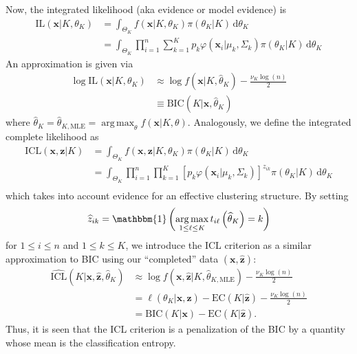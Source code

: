 \documentclass{uwstat572}
\newcommand*\ba{\[ \begin{aligned}}
\newcommand*\ea{\end{aligned} \]}
\newcommand*\ind[1]{\mathbbm{1}\left(#1\right)}
\newcommand*\estim[1]{\widehat{#1}}
\newcommand*\der{\text{d}}
\newcommand*\bx{\mathbf{x}}
\newcommand*\bz{\mathbf{z}}
\DeclareMathOperator*{\argmax}{arg\;max}
\renewcommand\;{\,}
\renewcommand\phi{\varphi}
\begin{document}
Now, the integrated likelihood (aka evidence or model evidence) is
\ba
\text{IL}(\bx | K, \theta_K)
	& = \int_{\Theta_{K}} f(\bx | K, \theta_K) \pi(\theta_K | K) \; \der \theta_K \\
	& = \int_{\Theta_{K}} \prod_{i=1}^n \sum_{k=1}^K p_k \phi(\bx_i | \mu_k, \Sigma_k) \pi(\theta_K | K) \; \der \theta_K
\ea
An approximation is given via
\ba
	\log \text{IL}(\bx | K, \theta_K) 
		& \approx \log f\left(\bx | K, \estim\theta_{K}\right)
		 - \frac{\nu_K \log(n)}{2} \\
		& \equiv \text{BIC}\left(K|\bx, \estim\theta_K \right)
\ea
where $\estim\theta_K = \estim\theta_{K, \text{MLE}} = \argmax_\theta f(\bx | K, \theta)$. 
Analogously, we define the integrated complete likelihood as
\ba
\text{ICL}(\bx, \bz | K)
	& = \int_{\Theta_K} f(\bx, \bz | K, \theta_K) \pi(\theta_K | K) \; \der \theta_K \\
	& = \int_{\Theta_K} \prod_{i=1}^n \prod_{k = 1}^K 
		\left[ p_k \phi(\bx_i | \mu_k, \Sigma_k) \right]^{z_{ik}} \pi(\theta_K | K) \; \der \theta_K \\
\ea
which takes into account evidence for an effective clustering structure. 
By setting
\begin{equation}\label{map}
\estim z_{ik} = \ind{ \argmax_{1 \le \ell \le K} t_{i \ell}\left(\estim\theta_{K}\right) = k }
\end{equation}
for $1 \le i \le n$ and $1 \le k \le K$,
we introduce the ICL criterion as a similar approximation to BIC using our ``completed'' data $(\bx, \estim\bz)$:
\ba
 \estim{\text{ICL}}\left(K|\bx, \estim\bz, \estim\theta_K\right) 
	& \approx 
	\log f\left(\bx, \estim\bz | K, \estim\theta_{K, \text{MLE}}\right) - 
		\frac{ \nu_K \log(n) }{2} \\
	& = \ell \left(\theta_K | \bx, \estim\bz \right) 
		- \text{EC}\left(K|\estim\bz\right) 
		- \frac{ \nu_K \log(n) }{2} \\
	& = \text{BIC}(K|\bx) - \text{EC}\left(K|\estim\bz\right).
\ea
Thus, it is seen that the ICL criterion is a penalization of the BIC by a quantity whose mean is the classification entropy.
\end{document}
